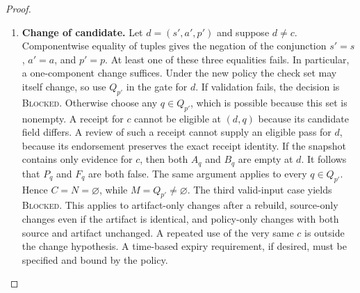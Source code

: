 \begin{proof}
\begin{enumerate}
\item \textbf{Change of candidate.}
Let $d=(s',a',p')$ and suppose $d\ne c$.
Componentwise equality of tuples gives the negation of
the conjunction $s'=s$, $a'=a$, and $p'=p$.
At least one of these three equalities fails.
In particular, a one-component change suffices.
Under the new policy the check set may itself change,
so use $Q_{p'}$ in the gate for $d$.
If validation fails, the decision is \textsc{Blocked}.
Otherwise choose any $q\in Q_{p'}$, which is possible
because this set is nonempty.
A receipt for $c$ cannot be eligible at $(d,q)$
because its candidate field differs.
A review of such a receipt cannot supply an eligible pass
for $d$, because its endorsement preserves the exact
receipt identity.
If the snapshot contains only evidence for $c$,
then both $A_q$ and $B_q$ are empty at $d$.
It follows that $P_q$ and $F_q$ are both false.
The same argument applies to every $q\in Q_{p'}$.
Hence $C=N=\varnothing$, while $M=Q_{p'}\ne\varnothing$.
The third valid-input case yields \textsc{Blocked}.
This applies to artifact-only changes after a rebuild,
source-only changes even if the artifact is identical, and
policy-only changes with both source and artifact unchanged.
A repeated use of the very same $c$ is outside the change
hypothesis. A time-based expiry requirement, if desired,
must be specified and bound by the policy.


\end{enumerate}
\end{proof}
